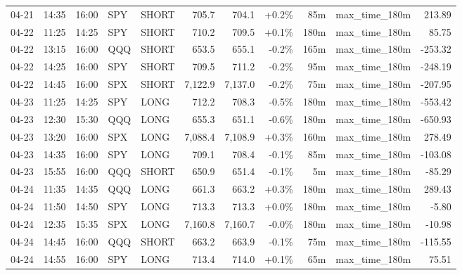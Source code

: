 \documentclass[11pt,a4paper,twoside]{article}
\begin{document}
\begin{center}
\begin{longtable}{>{\color{txtmain}}l l l l l r r r r >{\color{txtmain}}l r}
04-21 & 14:35 & 16:00 & SPY & SHORT & 705.7 & 704.1 & \textcolor{wingreen}{+0.2\%} & 85m & max\_time\_180m & \textcolor{wingreen}{213.89} \\
04-22 & 11:25 & 14:25 & SPY & SHORT & 710.2 & 709.5 & \textcolor{wingreen}{+0.1\%} & 180m & max\_time\_180m & \textcolor{wingreen}{85.75} \\
04-22 & 13:15 & 16:00 & QQQ & SHORT & 653.5 & 655.1 & \textcolor{lossred}{-0.2\%} & 165m & max\_time\_180m & \textcolor{lossred}{-253.32} \\
04-22 & 14:25 & 16:00 & SPY & SHORT & 709.5 & 711.2 & \textcolor{lossred}{-0.2\%} & 95m & max\_time\_180m & \textcolor{lossred}{-248.19} \\
04-22 & 14:45 & 16:00 & SPX & SHORT & 7,122.9 & 7,137.0 & \textcolor{lossred}{-0.2\%} & 75m & max\_time\_180m & \textcolor{lossred}{-207.95} \\
04-23 & 11:25 & 14:25 & SPY & LONG & 712.2 & 708.3 & \textcolor{lossred}{-0.5\%} & 180m & max\_time\_180m & \textcolor{lossred}{-553.42} \\
04-23 & 12:30 & 15:30 & QQQ & LONG & 655.3 & 651.1 & \textcolor{lossred}{-0.6\%} & 180m & max\_time\_180m & \textcolor{lossred}{-650.93} \\
04-23 & 13:20 & 16:00 & SPX & LONG & 7,088.4 & 7,108.9 & \textcolor{wingreen}{+0.3\%} & 160m & max\_time\_180m & \textcolor{wingreen}{278.49} \\
04-23 & 14:35 & 16:00 & SPY & LONG & 709.1 & 708.4 & \textcolor{lossred}{-0.1\%} & 85m & max\_time\_180m & \textcolor{lossred}{-103.08} \\
04-23 & 15:55 & 16:00 & QQQ & SHORT & 650.9 & 651.4 & \textcolor{lossred}{-0.1\%} & 5m & max\_time\_180m & \textcolor{lossred}{-85.29} \\
04-24 & 11:35 & 14:35 & QQQ & LONG & 661.3 & 663.2 & \textcolor{wingreen}{+0.3\%} & 180m & max\_time\_180m & \textcolor{wingreen}{289.43} \\
04-24 & 11:50 & 14:50 & SPY & LONG & 713.3 & 713.3 & \textcolor{wingreen}{+0.0\%} & 180m & max\_time\_180m & \textcolor{lossred}{-5.80} \\
04-24 & 12:35 & 15:35 & SPX & LONG & 7,160.8 & 7,160.7 & \textcolor{lossred}{-0.0\%} & 180m & max\_time\_180m & \textcolor{lossred}{-10.98} \\
04-24 & 14:45 & 16:00 & QQQ & SHORT & 663.2 & 663.9 & \textcolor{lossred}{-0.1\%} & 75m & max\_time\_180m & \textcolor{lossred}{-115.55} \\
04-24 & 14:55 & 16:00 & SPY & LONG & 713.4 & 714.0 & \textcolor{wingreen}{+0.1\%} & 65m & max\_time\_180m & \textcolor{wingreen}{75.51} \\

\end{longtable}
\end{center}
\end{document}
